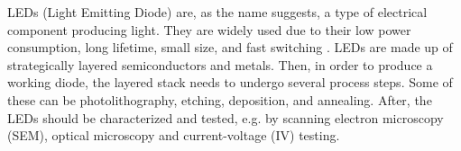 
\noindent LEDs (Light Emitting Diode) are, as the name suggests, a type of electrical component producing light. 
They are widely used due to their low power consumption, long lifetime, small size, and fast switching \cite{unknown}.
LEDs are made up of strategically layered semiconductors and metals.
Then, in order to produce a working diode, the layered stack needs to undergo several process steps.
Some of these can be photolithography, etching, deposition, and annealing.
After, the LEDs should be characterized and tested, e.g. by scanning electron microscopy (SEM), optical microscopy and current-voltage (IV) testing.



